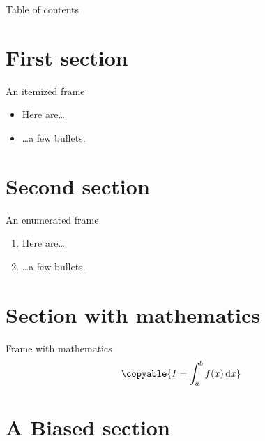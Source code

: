%
%

\begin{frame}
\titlepage
\end{frame}

\begin{frame}{Table of contents}
\tableofcontents
\end{frame}

\section{First section}

\begin{frame}{An itemized frame}
\begin{itemize}
\item Here are\ldots
\item \ldots a few bullets.
\end{itemize}
\end{frame}

\section{Second section}

\begin{frame}{An enumerated frame}
\begin{enumerate}
\item Here are\ldots
\item \ldots a few bullets.
\end{enumerate}
\end{frame}

\section{Section with mathematics}

\begin{frame}{Frame with mathematics}
\begin{equation}
\copyable{
  I = \int_a^b f(x) \,\mathrm d x
}
\end{equation}
\end{frame}

\section{A Biased section}

